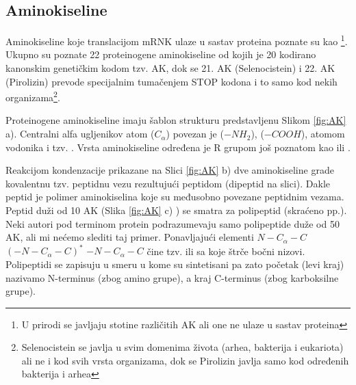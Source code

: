 \subsection{Aminokiseline}
Aminokiseline koje translacijom mRNK ulaze u sastav proteina poznate su kao
\footnote{U prirodi se javljaju stotine različitih AK ali
one ne ulaze u sastav proteina}.  Ukupno su poznate 22 proteinogene
aminokiseline od kojih je 20 kodirano kanonskim genetičkim kodom tzv.
 AK, dok se 21. AK (Selenocistein) i 22. AK (Pirolizin)
prevode specijalnim tumačenjem STOP kodona i to samo kod nekih organizama\footnote{
  Selenocistein se javlja u svim domenima života (arhea, bakterija i
  eukariota) ali ne i kod svih vrsta organizama, dok se Pirolizin javlja samo
kod određenih bakterija i arhea}. 

Proteinogene aminokiseline imaju šablon strukturu predstavljenu Slikom \ref{fig:AK} a).
Centralni alfa ugljenikov atom ($C_{\alpha}$) povezan je  ($-NH_2$), 
 ($-COOH$), atomom vodonika i tzv. .
Vrsta aminokiseline određena je R grupom još poznatom kao  ili  .

Reakcijom kondenzacije prikazane na Slici \ref{fig:AK} b) dve aminokiseline
grade kovalentnu tzv. peptidnu vezu rezultujući peptidom (dipeptid na slici).
Dakle peptid je polimer aminokiselina koje su međusobno povezane peptidnim
vezama.  Peptid duži od 10 AK (Slika \ref{fig:AK} c) ) se smatra za polipeptid (skraćeno pp.).
Neki autori pod terminom protein podrazumevaju samo polipeptide duže od 50 AK,
ali mi nećemo slediti taj primer.
Ponavljajući elementi $N-C_\alpha-C$ $(-N-C_\alpha-C)^*$ $-N-C_\alpha-C$ čine
tzv.  ili  sa koje štrče bočni nizovi.
Polipeptidi se zapisuju u smeru u kome su sintetisani pa zato  početak (levi kraj)
nazivamo N-terminus (zbog amino grupe), a kraj C-terminus (zbog karboksilne grupe).


